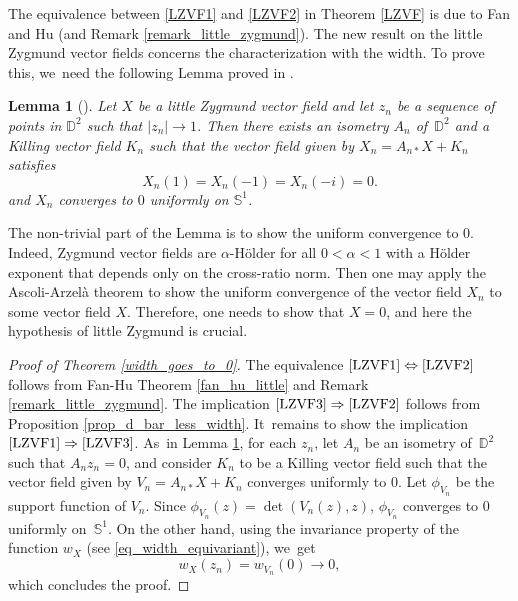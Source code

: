 \documentclass[JEP,XML,SOM,Unicode,NoEqCountersInSection, NoFloatCountersInSection,published]{cedram}
\theoremstyle{plain}
\newtheorem{lemma}[cor]{Lemma}
\theoremstyle{definition}
\begin{document}
The equivalence between \eqref{LZVF1} and \eqref{LZVF2} in Theorem \ref{LZVF} is due to Fan and Hu \cite{FanJun} (and Remark \ref{remark_little_zygmund}). The new result on the little Zygmund vector fields concerns the characterization with the width. To prove this, we~need the following Lemma proved in \cite{FanJun}.

\begin{lemma}[{\cite[p.\,1167]{FanJun}}]
\label{teck_little}
Let $X$ be a little Zygmund vector field and let $z_n$ be a sequence of points in $\mathbb{D}^2$ such that $\lvert z_n\rvert\to1$. Then there exists an isometry $A_n$ of~$\mathbb{D}^2$ and a Killing vector field $K_n$ such that the vector field given by $X_n=A_{n*}X+K_n$ satisfies\vspace*{-3pt}
\[
X_n(1)=X_n(-1)=X_n(-i)=0.
\]
and $X_n$ converges to $0$ uniformly on $\mathbb{S}^1$.
\end{lemma}

The non-trivial part of the Lemma is to show the uniform convergence to $0$. Indeed, Zygmund vector fields are $\alpha$-Hölder for all $0<\alpha<1$ with a Hölder exponent that depends only on the cross-ratio norm. Then one may apply the Ascoli-Arzelà theorem to show the uniform convergence of the vector field $X_n$ to some vector field $X$. Therefore, one needs to show that $X=0$, and here the hypothesis of little Zygmund is crucial.

\begin{proof}[Proof of Theorem \ref{width_goes_to_0}]
The equivalence $\eqref{LZVF1}\Leftrightarrow\eqref{LZVF2}$ follows from Fan-Hu Theorem \ref{fan_hu_little} and Remark \ref{remark_little_zygmund}. The implication $\eqref{LZVF3}\Rightarrow\eqref{LZVF2}$ follows from Proposition \ref{prop_d_bar_less_width}. It~remains to show the implication $\eqref{LZVF1}\Rightarrow\eqref{LZVF3}$. As~in Lemma \ref{teck_little}, for each $z_n$, let $A_n$ be an isometry of~$\mathbb{D}^2$ such that $A_nz_n=0$, and consider $K_n$ to be a Killing vector field such that the vector field given by $V_n=A_{n*}X+K_n$ converges uniformly to $0$.
Let \(\phi_{V_n}\) be the support function of \(V_n\). Since \(\phi_{V_n}(z) = \det(V_n(z), z)\), \(\phi_{V_n}\) converges to \(0\) uniformly on~\(\mathbb{S}^1\). On the other hand, using the invariance property of the function \(w_X\) (see \eqref{eq_width_equivariant}), we~get
\[ w_X(z_n) = w_{V_n}(0) \to 0, \]
which concludes the proof.
\end{proof}
\end{document}
